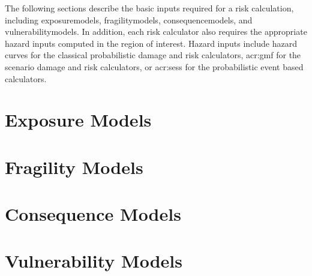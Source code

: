 The following sections describe the basic inputs required for a risk
calculation, including \glspl{exposuremodel}, \glspl{fragilitymodel},
\glspl{consequencemodel}, and \glspl{vulnerabilitymodel}. In addition, each
risk calculator also requires the appropriate hazard inputs computed in the
region of interest. Hazard inputs include hazard curves for the classical
probabilistic damage and risk calculators, \gls{acr:gmf} for the scenario
damage and risk calculators, or \glspl{acr:ses} for the probabilistic event
based calculators.


\section{Exposure Models}
\label{sec:exposure}


\section{Fragility Models}
\label{sec:fragility}


\section{Consequence Models}
\label{sec:consequence}


\section{Vulnerability Models}
\label{sec:vulnerability}
